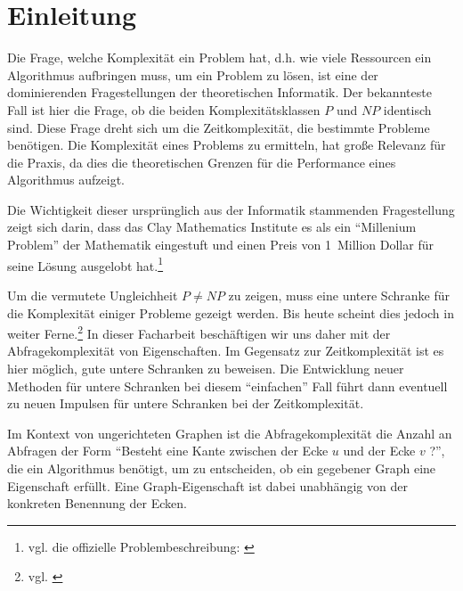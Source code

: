 \documentclass[10pt,a4paper, footheight=1mm]{scrreprt}
\theoremstyle{definition}
\begin{document}



\begin{large}
\tableofcontents
\end{large}

\thispagestyle{empty}

\chapter{Einleitung}
Die Frage, welche Komplexität ein Problem hat, d.h.
wie viele Ressourcen ein Algorithmus aufbringen muss,
um ein Problem zu lösen, ist eine der dominierenden
Fragestellungen der theoretischen Informatik.
Der bekannteste Fall ist hier die Frage, ob die beiden
Komplexitätsklassen $P$ und $NP$ identisch sind. Diese
Frage dreht sich um die Zeitkomplexität, die bestimmte
Probleme benötigen. Die Komplexität eines Problems zu ermitteln, hat
große Relevanz für die Praxis, da dies die theoretischen
Grenzen für die Performance eines Algorithmus aufzeigt.

Die Wichtigkeit dieser ursprünglich aus der Informatik
stammenden Fragestellung zeigt sich darin, dass das Clay
Mathematics Institute es als ein "`Millenium Problem"'
der Mathematik eingestuft und einen Preis von
1~Million Dollar für seine Lösung ausgelobt hat.\footnote{
vgl. die offizielle Problembeschreibung:
\cite{PvsNPOfficial}} 

Um die vermutete Ungleichheit $P\neq NP$ zu zeigen,
muss eine untere Schranke für die Komplexität einiger
Probleme gezeigt werden. Bis heute scheint dies jedoch
in weiter Ferne.\footnote{vgl. \cite{PvsNP}}
In dieser Facharbeit beschäftigen wir uns daher mit
der  Abfragekomplexität von Eigenschaften. Im Gegensatz
zur Zeitkomplexität ist es hier möglich, gute
untere Schranken zu beweisen. Die Entwicklung
neuer Methoden für untere Schranken bei diesem "`einfachen"' Fall
führt dann eventuell zu neuen Impulsen für untere
Schranken bei der Zeitkomplexität.

Im Kontext von ungerichteten Graphen
ist die Abfragekomplexität die Anzahl
an Abfragen der Form "`Besteht eine Kante zwischen
der Ecke $u$ und der Ecke $v$ ?"', die ein Algorithmus
benötigt, um zu entscheiden, ob ein gegebener Graph
eine Eigenschaft erfüllt. Eine Graph-Eigenschaft ist
dabei unabhängig von der konkreten Benennung der Ecken.
\end{document}
